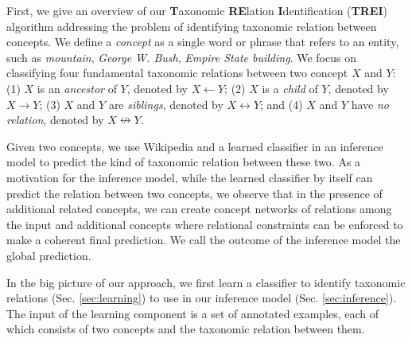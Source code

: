 First, we give an overview of our {\bf T}axonomic {\bf RE}lation {\bf
  I}dentification ({\bf TREI}) algorithm addressing the problem of
identifying taxonomic relation between concepts. We define a {\em
  concept} as a single word or phrase that refers to an entity, such
as {\em mountain}, {\em George W. Bush}, {\em Empire State building}.
We focus on classifying four fundamental taxonomic relations between
two concept $X$ and $Y$: (1) $X$ is an {\em ancestor} of $Y$, denoted
by $X \leftarrow Y$; (2) $X$ is a {\em child} of $Y$, denoted by $X
\rightarrow Y$; (3) $X$ and $Y$ are {\em siblings}, denoted by $X
\leftrightarrow Y$; and (4) $X$ and $Y$ have {\em no relation},
denoted by $X \nleftrightarrow Y$.


Given two concepts, we use Wikipedia and a learned classifier in an
inference model to predict the kind of taxonomic relation between
these two. As a motivation for the inference model, while the learned
classifier by itself can predict the relation between two concepts, we
observe that in the presence of additional related concepts, we can
create concept networks of relations among the input and additional
concepts where relational constraints can be enforced to make a
coherent final prediction. We call the outcome of the inference model
the global prediction.

In the big picture of our approach, we first learn a classifier to
identify taxonomic relations (Sec. \ref{sec:learning}) to use in our
inference model (Sec. \ref{sec:inference}). The input of the learning
component is a set of annotated examples, each of which consists of
two concepts and the taxonomic relation between them.





